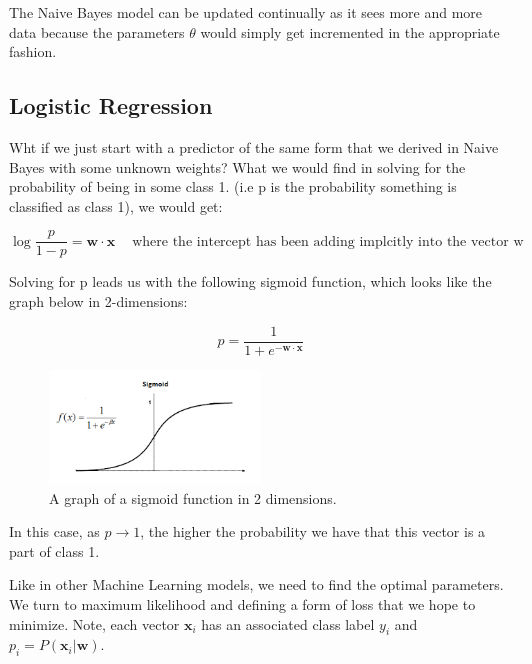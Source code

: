 The Naive Bayes model can be updated continually as it sees more and more data because the parameters $\theta$ would simply get incremented in the appropriate fashion.

\subsection{Logistic Regression}

Wht if we just start with a predictor of the same form that we derived in Naive Bayes with some unknown weights?  What we would find in solving for the probability of being in some class 1.  (i.e p is the probability something is classified as class 1), we would get:


\begin{equation}
\log \frac{p}{ 1 - p} = \mathbf{w} \cdot \mathbf{x} ~~~~ \text{ where the intercept has been adding implcitly into the vector w}
\end{equation}

\pagebreak 
Solving for p leads us with the following sigmoid function, which looks like the graph below in 2-dimensions:

\begin{equation}
p = \frac{1}{ 1 + e^{- \mathbf{w} \cdot \mathbf{x}}}
\end{equation}

\begin{figure}[ht]
  \begin{center}
    \includegraphics[width=0.5\textwidth]{figures/sigmoid.png}
    \caption{
      A graph of a sigmoid function in 2 dimensions. }
    \label{Figure 1}
  \end{center}
\end{figure}

In this case, as $p \to 1$, the higher the probability we have that this vector is a part of class 1.  

Like in other Machine Learning models, we need to find the optimal parameters.  We turn to maximum likelihood and defining a form of loss that we hope to minimize.  Note, each vector $\mathbf{x}_i$ has an associated class label $y_i$ and $p_i = P(\mathbf{x}_i | \mathbf{w})$.  

